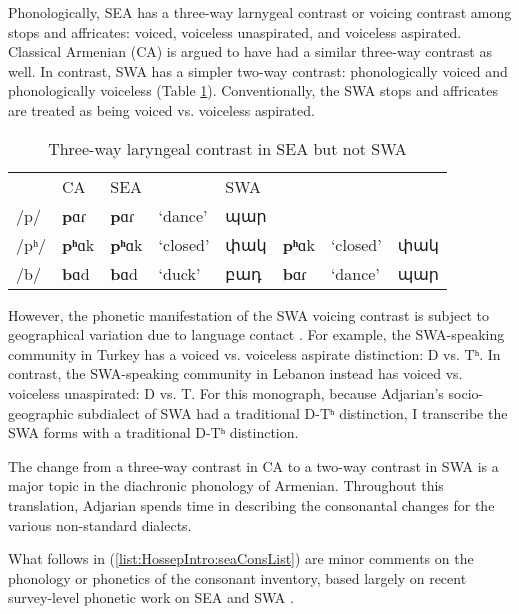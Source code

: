Phonologically, SEA has a three-way larnygeal contrast or voicing contrast among stops and affricates: voiced, voiceless unaspirated, and voiceless aspirated. Classical Armenian (CA) is argued to have had a similar three-way contrast as well. In contrast, SWA has a simpler two-way contrast: phonologically voiced and phonologically voiceless (Table \ref{tab:intro:ea wa differences: phono}). Conventionally, the SWA stops and affricates are treated as being voiced vs. voiceless aspirated.

\begin{table}[H]
	\caption{Three-way laryngeal contrast in SEA but not SWA}
	\label{tab:intro:ea wa differences: phono}
	\centering
	\begin{tabular}{|l|llll| lll| }
		\hline 	& CA & SEA & & SWA & & & 
		\\
		/p/ & \textbf{p}ɑɾ& \textbf{p}ɑɾ & `dance' & պար & & & 
		\\
		/pʰ/ & \textbf{pʰ}ɑk & \textbf{pʰ}ɑk & `closed' &փակ& \textbf{pʰ}ɑk & `closed' & փակ
		\\
		/b/ & \textbf{b}ɑd & \textbf{b}ɑd & `duck' & բադ & \textbf{b}ɑɾ & `dance'& պար \\ \hline
	\end{tabular}
\end{table}

However, the phonetic manifestation of the SWA voicing contrast is subject to geographical variation due to language contact \citep{kellyKeshishian-2021-VoicingWesternArmenian,Tahtadjian-2021-PhoneticInterferenceProductionStopsWesternArmenianBilingual}. For example, the SWA-speaking community in Turkey has a voiced vs. voiceless aspirate distinction: D vs. Tʰ. In contrast, the SWA-speaking community in Lebanon instead has voiced vs. voiceless unaspirated: D vs. T. For this monograph, because Adjarian's socio-geographic subdialect of SWA had a traditional D-Tʰ distinction, I transcribe the SWA forms with a traditional D-Tʰ distinction. 

The change from a three-way contrast in CA to a two-way contrast in SWA is a major topic in the diachronic phonology of Armenian. Throughout this translation, Adjarian spends time in describing the consonantal changes for the various non-standard dialects. 


What follows in (\ref{list:HossepIntro:seaConsList}) are minor comments on the  phonology or phonetics of the consonant inventory, based largely on recent survey-level phonetic work on SEA and SWA \citep{Seyfarth-JIPAArmenian}. 


